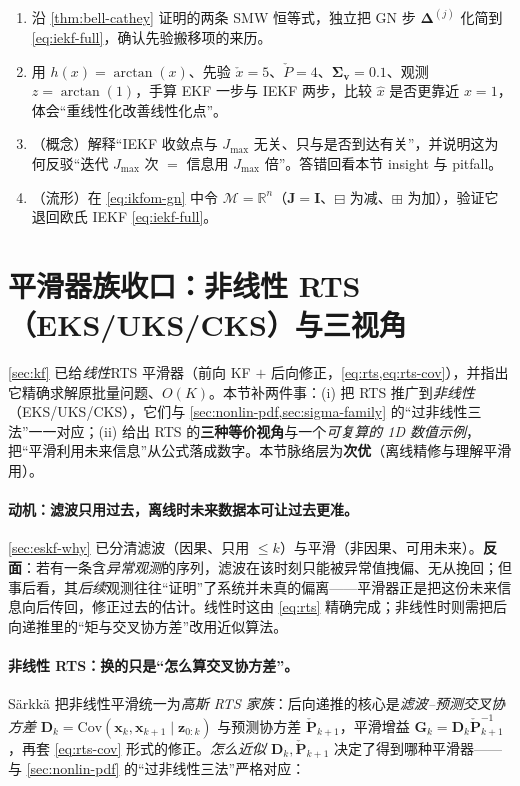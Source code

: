 \begin{practice}
\begin{enumerate}
  \item 沿 \cref{thm:bell-cathey} 证明的两条 SMW 恒等式，独立把 GN 步 $\boldsymbol{\Delta}^{(j)}$ 化简到 \cref{eq:iekf-full}，确认先验搬移项的来历。
  \item 用 $h(x)=\arctan(x)$、先验 $\check{x}=5$、$\check{P}=4$、$\boldsymbol{\Sigma}_{\mathbf{v}}=0.1$、观测 $z=\arctan(1)$，手算 EKF 一步与 IEKF 两步，比较 $\hat{x}$ 是否更靠近 $x=1$，体会“重线性化改善线性化点”。
  \item （概念）解释“IEKF 收敛点与 $J_{\max}$ 无关、只与是否到达有关”，并说明这为何反驳“迭代 $J_{\max}$ 次 $=$ 信息用 $J_{\max}$ 倍”。答错回看本节 insight 与 pitfall。
  \item （流形）在 \cref{eq:ikfom-gn} 中令 $\mathcal{M}=\mathbb{R}^n$（$\mathbf{J}=\mathbf{I}$、$\boxminus$ 为减、$\boxplus$ 为加），验证它退回欧氏 IEKF \cref{eq:iekf-full}。
\end{enumerate}
\end{practice}

\section{平滑器族收口：非线性 RTS（EKS/UKS/CKS）与三视角}
\label{sec:rts-family}

\cref{sec:kf} 已给\emph{线性}RTS 平滑器（前向 KF $+$ 后向修正，\cref{eq:rts,eq:rts-cov}），并指出它精确求解原批量问题、$O(K)$。本节补两件事：(i) 把 RTS 推广到\emph{非线性}（EKS/UKS/CKS），它们与 \cref{sec:nonlin-pdf,sec:sigma-family} 的“过非线性三法”一一对应；(ii) 给出 RTS 的\textbf{三种等价视角}与一个\emph{可复算的 1D 数值示例}，把“平滑利用未来信息”从公式落成数字。本节脉络层为\textbf{次优}（离线精修与理解平滑用）。

\paragraph{动机：滤波只用过去，离线时未来数据本可让过去更准。}
\cref{sec:eskf-why} 已分清滤波（因果、只用 $\le k$）与平滑（非因果、可用未来）。\textbf{反面}：若有一条含\emph{异常观测}的序列，滤波在该时刻只能被异常值拽偏、无从挽回；但事后看，其\emph{后续}观测往往“证明”了系统并未真的偏离——平滑器正是把这份未来信息向后传回，修正过去的估计。线性时这由 \cref{eq:rts} 精确完成；非线性时则需把后向递推里的“矩与交叉协方差”改用近似算法。

\paragraph{非线性 RTS：换的只是“怎么算交叉协方差”。}
Särkkä\cite{sarkka2013bayesian} 把非线性平滑统一为\emph{高斯 RTS 家族}：后向递推的核心是\emph{滤波--预测交叉协方差} $\mathbf{D}_{k}=\mathrm{Cov}(\mathbf{x}_k,\mathbf{x}_{k+1}\mid\mathbf{z}_{0:k})$ 与预测协方差 $\check{\mathbf{P}}_{k+1}$，平滑增益 $\mathbf{G}_k=\mathbf{D}_k\check{\mathbf{P}}_{k+1}^{-1}$，再套 \cref{eq:rts-cov} 形式的修正。\emph{怎么近似 $\mathbf{D}_k,\check{\mathbf{P}}_{k+1}$} 决定了得到哪种平滑器——与 \cref{sec:nonlin-pdf} 的“过非线性三法”严格对应：


